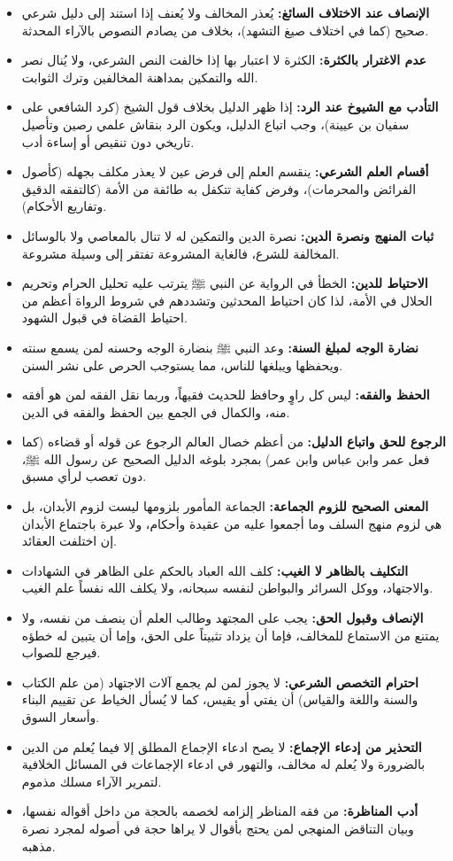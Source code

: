 \begin{itemize}
    \item \textbf{الإنصاف عند الاختلاف السائغ:} يُعذر المخالف ولا يُعنف إذا استند إلى دليل شرعي صحيح (كما في اختلاف صيغ التشهد)، بخلاف من يصادم النصوص بالآراء المحدثة.
    \item \textbf{عدم الاغترار بالكثرة:} الكثرة لا اعتبار بها إذا خالفت النص الشرعي، ولا يُنال نصر الله والتمكين بمداهنة المخالفين وترك الثوابت.
    \item \textbf{التأدب مع الشيوخ عند الرد:} إذا ظهر الدليل بخلاف قول الشيخ (كرد الشافعي على سفيان بن عيينة)، وجب اتباع الدليل، ويكون الرد بنقاش علمي رصين وتأصيل تاريخي دون تنقيص أو إساءة أدب.
    \item \textbf{أقسام العلم الشرعي:} ينقسم العلم إلى فرض عين لا يعذر مكلف بجهله (كأصول الفرائض والمحرمات)، وفرض كفاية تتكفل به طائفة من الأمة (كالتفقه الدقيق وتفاريع الأحكام).
    \item \textbf{ثبات المنهج ونصرة الدين:} نصرة الدين والتمكين له لا تنال بالمعاصي ولا بالوسائل المخالفة للشرع، فالغاية المشروعة تفتقر إلى وسيلة مشروعة.
    \item \textbf{الاحتياط للدين:} الخطأ في الرواية عن النبي ﷺ يترتب عليه تحليل الحرام وتحريم الحلال في الأمة، لذا كان احتياط المحدثين وتشددهم في شروط الرواة أعظم من احتياط القضاة في قبول الشهود.
    \item \textbf{نضارة الوجه لمبلغ السنة:} وعد النبي ﷺ بنضارة الوجه وحسنه لمن يسمع سنته ويحفظها ويبلغها للناس، مما يستوجب الحرص على نشر السنن.
    \item \textbf{الحفظ والفقه:} ليس كل راوٍ وحافظ للحديث فقيهاً، وربما نقل الفقه لمن هو أفقه منه، والكمال في الجمع بين الحفظ والفقه في الدين.
    \item \textbf{الرجوع للحق واتباع الدليل:} من أعظم خصال العالم الرجوع عن قوله أو قضاءه (كما فعل عمر وابن عباس وابن عمر) بمجرد بلوغه الدليل الصحيح عن رسول الله ﷺ، دون تعصب لرأي مسبق.
    \item \textbf{المعنى الصحيح للزوم الجماعة:} الجماعة المأمور بلزومها ليست لزوم الأبدان، بل هي لزوم منهج السلف وما أجمعوا عليه من عقيدة وأحكام، ولا عبرة باجتماع الأبدان إن اختلفت العقائد.
    \item \textbf{التكليف بالظاهر لا الغيب:} كلف الله العباد بالحكم على الظاهر في الشهادات والاجتهاد، ووكل السرائر والبواطن لنفسه سبحانه، ولا يكلف الله نفساً علم الغيب.
    \item \textbf{الإنصاف وقبول الحق:} يجب على المجتهد وطالب العلم أن ينصف من نفسه، ولا يمتنع من الاستماع للمخالف، فإما أن يزداد تثبيتاً على الحق، وإما أن يتبين له خطؤه فيرجع للصواب.
    \item \textbf{احترام التخصص الشرعي:} لا يجوز لمن لم يجمع آلات الاجتهاد (من علم الكتاب والسنة واللغة والقياس) أن يفتي أو يقيس، كما لا يُسأل الخياط عن تقييم البناء وأسعار السوق.
    \item \textbf{التحذير من إدعاء الإجماع:} لا يصح ادعاء الإجماع المطلق إلا فيما يُعلم من الدين بالضرورة ولا يُعلم له مخالف، والتهور في ادعاء الإجماعات في المسائل الخلافية لتمرير الآراء مسلك مذموم.
    \item \textbf{أدب المناظرة:} من فقه المناظر إلزامه لخصمه بالحجة من داخل أقواله نفسها، وبيان التناقض المنهجي لمن يحتج بأقوال لا يراها حجة في أصوله لمجرد نصرة مذهبه.
\end{itemize}

